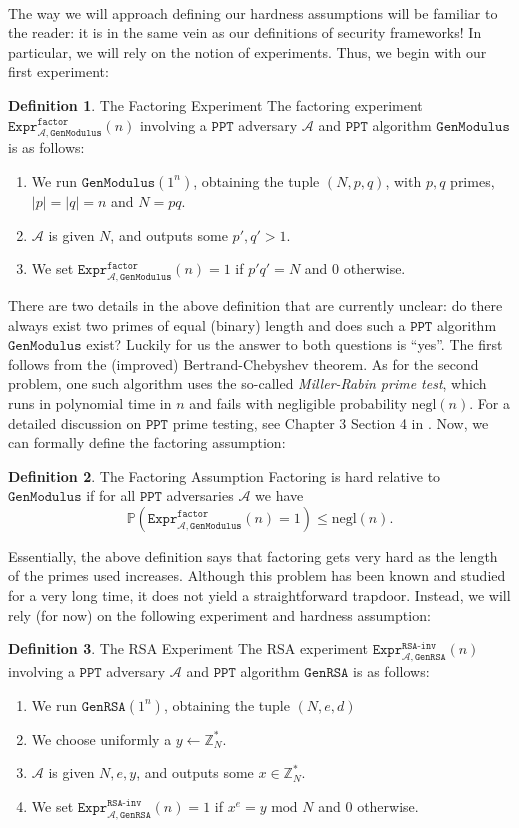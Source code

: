\documentclass{article}
\theoremstyle{definition}
\newtheorem{definition}{Definition}[section]
\newcommand{\A}{\mathcal{A}}
\newcommand{\Prob}{\mathbb{P}}
\newcommand{\Int}{\mathbb{Z}}
\newcommand{\PPT}{\texttt{PPT}}
\newcommand{\negl}{\text{negl}}
\renewcommand{\mod}{\,\,\text{mod}\,\,}
\newcommand{\Expr}[2]{\texttt{Expr}^{\texttt{#1}}_{#2}}
\newcommand{\GenModulus}{\texttt{GenModulus}}
\newcommand{\GenRSA}{\texttt{GenRSA}}
\begin{document}
\paragraph{} The way we will approach defining our hardness assumptions will be
familiar to the reader: it is in the same vein as our definitions of security
frameworks! In particular, we will rely on the notion of experiments. Thus, we
begin with our first experiment:
\begin{definition}{The Factoring Experiment} The factoring experiment
  $\Expr{factor}{\A, \GenModulus}(n)$ involving a $\PPT$ adversary $\A$ and
  $\PPT$ algorithm $\GenModulus$ is as follows:
  \begin{enumerate}
  \item We run $\GenModulus(1^n)$, obtaining the tuple $(N, p, q)$, with $p, q$
    primes, $|p| = |q| = n$ and $N = pq$.
  \item $\A$ is given $N$, and outputs some $p', q' > 1$.
  \item We set $\Expr{factor}{\A, \GenModulus}(n) = 1$ if $p'q' = N$ and $0$ otherwise.
  \end{enumerate}
\end{definition}
There are two details in the above definition that are currently unclear: do
there always exist two primes of equal (binary) length and does such a
$\PPT$ algorithm $\GenModulus$ exist? Luckily for us the answer to both
questions is ``yes''. The first follows from the (improved) Bertrand-Chebyshev
theorem. As for the second problem, one such algorithm uses the so-called
\textit{Miller-Rabin prime test}, which runs
in polynomial time in $n$ and fails with negligible probability $\negl(n)$. For
a detailed discussion on $\PPT$ prime testing, see Chapter 3 Section 4 in \cite{hoffstein2014introduction}.
Now, we can formally define the factoring assumption:
\begin{definition}{The Factoring Assumption}
  Factoring is hard relative to $\GenModulus$ if for all $\PPT$ adversaries $\A$
  we have
  \[
    \Prob(\Expr{factor}{\A, \GenModulus}(n) = 1) \leq \negl(n).
  \]
\end{definition}
Essentially, the above definition says that factoring gets very hard as the
length of the primes used increases. Although this problem has been known and
studied for a very long time, it does not yield a straightforward trapdoor.
Instead, we will rely (for now) on the following experiment and hardness assumption:
\begin{definition}{The RSA Experiment}
The RSA experiment $\Expr{RSA-inv}{\A, \GenRSA}(n)$ involving a $\PPT$ adversary $\A$ and
  $\PPT$ algorithm $\GenRSA$ is as follows:
  \begin{enumerate}
  \item We run $\GenRSA(1^n)$, obtaining the tuple $(N, e, d)$
  \item We choose uniformly a $y \leftarrow \Int_N^*$.
  \item $\A$ is given $N, e, y$, and outputs some $x \in \Int_N^*$.
  \item We set $\Expr{RSA-inv}{\A, \GenRSA}(n) = 1$ if $x^e = y \mod N$ and $0$ otherwise.
  \end{enumerate}
\end{definition}
\end{document}
